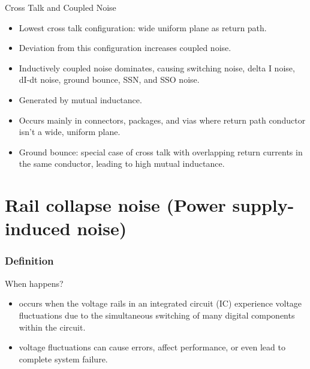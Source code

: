 \documentclass[10pt,hyperref={pdfpagemode=FullScreen},aspectratio=169]{beamer}
\begin{document}
\begin{frame}{Cross Talk and Coupled Noise}
  \begin{itemize}
    \item Lowest cross talk configuration: wide uniform plane as return path.
    \item Deviation from this configuration increases coupled noise.
    \item Inductively coupled noise dominates, causing switching noise, delta I noise, dI-dt noise, ground bounce, SSN, and SSO noise.
    \item Generated by mutual inductance.
    \item Occurs mainly in connectors, packages, and vias where return path conductor isn't a wide, uniform plane.
    \item Ground bounce: special case of cross talk with overlapping return currents in the same conductor, leading to high mutual inductance.
  \end{itemize}
\end{frame}

\section{Rail collapse noise (Power supply-induced noise)}


\begin{frame}
  \frametitle{Definition}

  \begin{block}{When happens?}
    \begin{itemize}
      \item occurs when the voltage rails in an integrated circuit (IC) experience voltage fluctuations due to the simultaneous switching of many digital components within the circuit.
      \item voltage fluctuations can cause errors, affect performance, or even lead to complete system failure.
    \end{itemize}
  \end{block}
\end{frame}
\end{document}
